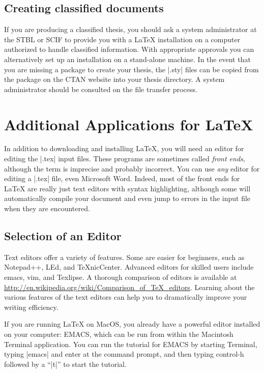 \subsection{Creating classified documents}
If you are producing a classified thesis, you should ask a
system administrator at the STBL or SCIF to provide you with a
\LaTeX{} installation on a computer authorized to handle classified
information. With appropriate approvals you can alternatively set up an
installation on a stand-alone machine.
In the event that you are missing a package to create your thesis, the |.sty| files can be copied from the package on the CTAN website into your thesis directory.  A system administrator should be consulted on the file transfer process.  

\section{Additional Applications for \LaTeX{} }

In addition to downloading and installing \LaTeX, you will need an
editor for editing the |.tex| input files. These programs are
sometimes called \emph{front ends}, although the term is imprecise and
probably incorrect. You can use \emph{any} editor for editing a |.tex|
file, even Microsoft Word. Indeed, most of the front ends for \LaTeX{} 
are really just text editors with syntax highlighting, although some
will automatically compile your document and even jump to errors in
the input file when they are encountered.

\subsection{Selection of an Editor}
Text editors offer a variety of features.  Some are easier for beginners,
 such as Notepad++, LEd, and TeXnicCenter.  Advanced editors for skilled users
 include emacs, vim, and Texlipse.  A thorough comparison of editors 
 is available at
 \url{http://en.wikipedia.org/wiki/Comparison_of_TeX_editors}.  Learning about the various
 features of the text editors can help you to dramatically improve your writing efficiency.

If you are running \LaTeX{} on MacOS, you already have a powerful editor
installed on your computer: EMACS, which can be run from within the
Macintosh Terminal application. You can run the tutorial for EMACS by
starting Terminal, typing |emacs| and enter at the command prompt, and
then typing control-h followed by a ``|t|'' to start the tutorial.

